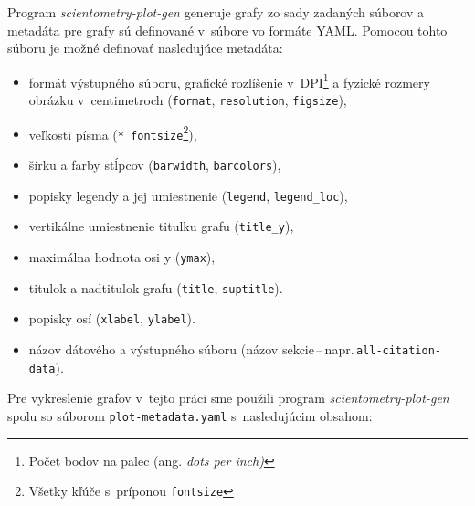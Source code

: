 \noindent Program \emph{scientometry-plot-gen} generuje grafy zo sady zadaných súborov a
metadáta pre grafy sú definované v~súbore vo formáte YAML. Pomocou tohto súboru
je možné definovať nasledujúce metadáta:
\begin{itemize}
  \item formát výstupného súboru, grafické rozlíšenie v~DPI\footnote{Počet bodov na palec (ang. \emph{dots per inch)}} a fyzické rozmery obrázku v~centimetroch (\verb|format|, \verb|resolution|, \verb|figsize|),
  \item veľkosti písma (\verb|*_fontsize|\footnote{Všetky kľúče s~príponou \texttt{fontsize}}),
  \item šírku a farby stĺpcov (\verb|barwidth|, \verb|barcolors|),
  \item popisky legendy a jej umiestnenie  (\verb|legend|, \verb|legend_loc|),
  \item vertikálne umiestnenie titulku grafu (\verb|title_y|),
  \item maximálna hodnota osi y (\verb|ymax|),
  \item titulok a nadtitulok grafu (\verb|title|, \verb|suptitle|).
  \item popisky osí (\verb|xlabel|, \verb|ylabel|).
  \item názov dátového a výstupného súboru (názov sekcie\,--\,napr.\,\verb|all-citation-data|).
\end{itemize}
Pre vykreslenie grafov v~tejto práci sme použili program
\emph{scientometry-plot-gen} spolu so súborom \verb|plot-metadata.yaml|
s~nasledujúcim obsahom:

